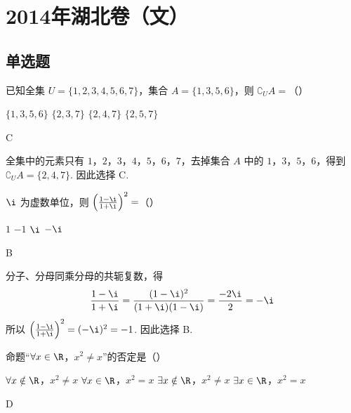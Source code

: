 \chapter{2014年湖北卷（文）}

\section{单选题}

\begin{problem}
已知全集 \(U = \{1, 2, 3, 4, 5, 6, 7\}\)，集合 \(A = \{1, 3, 5, 6\}\)，则 \(\complement_U A =\)（\quad）

\choices
    {\(\{1,3,5,6\}\)}
    {\(\{2,3,7\}\)}
    {\(\{2,4,7\}\)}
    {\(\{2,5,7\}\)}
\end{problem}

\begin{answer}
C
\end{answer}

\begin{solution}
全集中的元素只有 \(1\)，\(2\)，\(3\)，\(4\)，\(5\)，\(6\)，\(7\)，去掉集合 \(A\) 中的 \(1\)，\(3\)，\(5\)，\(6\)，得到 \(\complement_U A=\{2,4,7\}\). 因此选择 C.
\end{solution}

\begin{problem}
\(\i\) 为虚数单位，则 \(\left(\frac{1-\i}{1+\i}\right)^{2}= \)（\quad）

\choices
    {\(1\)}
    {\(-1\)}
    {\(\i\)}
    {\(-\i\)}
\end{problem}

\begin{answer}
B
\end{answer}

\begin{solution}
分子、分母同乘分母的共轭复数，得
\[
\frac{1-\i}{1+\i}=\frac{(1-\i)^2}{(1+\i)(1-\i)}=\frac{-2\i}{2}=-\i
\]
所以 \(\left(\frac{1-\i}{1+\i}\right)^2=(-\i)^2=-1\). 因此选择 B.
\end{solution}

\begin{problem}
命题“\(\forall x \in \R\)，\(x^2 \neq x\)”的否定是（\quad）

\choices
    {\(\forall x \notin \R\)，\(x^2 \neq x\)}
    {\(\forall x \in \R\)，\(x^2 = x\)}
    {\(\exists x \notin \R\)，\(x^2 \neq x\)}
    {\(\exists x \in \R\)，\(x^2 = x\)}
\end{problem}

\begin{answer}
D
\end{answer}

